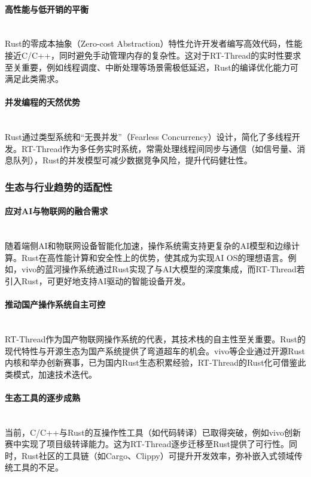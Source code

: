 \paragraph{高性能与低开销的平衡}\ \\
 \indent Rust的零成本抽象（Zero-cost Abstraction）特性允许开发者编写高效代码，性能接近C/C++，同时避免手动管理内存的复杂性。这对于RT-Thread的实时性要求至关重要，例如线程调度、中断处理等场景需极低延迟，Rust的编译优化能力可满足此类需求。
\paragraph{并发编程的天然优势}\ \\
 \indent Rust通过类型系统和“无畏并发”（Fearless Concurrency）设计，简化了多线程开发。RT-Thread作为多任务实时系统，常需处理线程间同步与通信（如信号量、消息队列），Rust的并发模型可减少数据竞争风险，提升代码健壮性。
\subsubsection{生态与行业趋势的适配性}
\paragraph{应对AI与物联网的融合需求}\ \\
 \indent 随着端侧AI和物联网设备智能化加速，操作系统需支持更复杂的AI模型和边缘计算。Rust在高性能计算和安全性上的优势，使其成为实现AI OS的理想语言。例如，vivo的蓝河操作系统通过Rust实现了与AI大模型的深度集成，而RT-Thread若引入Rust，可更好地支持AI驱动的智能设备开发。
\paragraph{推动国产操作系统自主可控}\ \\
 \indent RT-Thread作为国产物联网操作系统的代表，其技术栈的自主性至关重要。Rust的现代特性与开源生态为国产系统提供了弯道超车的机会。vivo等企业通过开源Rust内核和举办创新赛事，已为国内Rust生态积累经验，RT-Thread的Rust化可借鉴此类模式，加速技术迭代。
\paragraph{生态工具的逐步成熟}\ \\
 \indent 当前，C/C++与Rust的互操作性工具（如代码转译）已取得突破，例如vivo创新赛中实现了项目级转译能力。这为RT-Thread逐步迁移至Rust提供了可行性。同时，Rust社区的工具链（如Cargo、Clippy）可提升开发效率，弥补嵌入式领域传统工具的不足。
